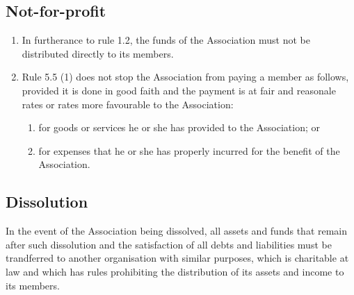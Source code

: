 \subsection{Not-for-profit}
\begin{enumerate}
  \item In furtherance to rule 1.2, the funds of the Association must not be distributed directly to its members.
  \item Rule 5.5 (1) does not stop the Association from paying a member as follows, provided it is done in good faith and the payment is at fair and reasonale rates or rates more favourable to the Association:
    \begin{enumerate}
      \item for goods or services he or she has provided to the Association; or
      \item for expenses that he or she has properly incurred for the benefit of the Association.
    \end{enumerate}
\end{enumerate}

\subsection{Dissolution}
In the event of the Association being dissolved, all assets and funds that remain after such dissolution and the satisfaction of all debts and liabilities must be trandferred to another organisation with similar purposes, which is charitable at law and which has rules prohibiting the distribution of its assets and income to its members.
